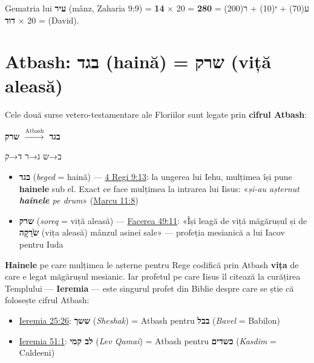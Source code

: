 \documentclass[12pt,a4paper,twoside,openany]{book}
\begin{document}
Gematria lui \textbf{עיר} (mânz, Zaharia 9:9) = ע(70) + י(10) + ר(200) = \textbf{280} = 20 × \textbf{14} = 20 × \textbf{דוד} (David).

\section{Atbash: בגד (haină) = שרק (viță aleasă)}

Cele două surse vetero-testamentare ale Floriilor sunt legate prin \textbf{cifrul Atbash}:

\begin{center}
\large\bfseries
בגד $\xrightarrow{\text{Atbash}}$ שרק
\end{center}

\begin{center}
ב→ש \quad ג→ר \quad ד→ק
\end{center}

\begin{itemize}
  \item \textbf{בגד} (\textit{beged} = haină) — \href{https://bibliaortodoxa.ro/carte.php?id=69\&cap=9\#13}{4 Regi 9:13}: la ungerea lui Iehu, mulțimea își pune \textbf{hainele} sub el. Exact ce face mulțimea la intrarea lui Iisus: «\textit{și-au așternut \textbf{hainele} pe drum}» (\href{https://bibliaortodoxa.ro/carte.php?id=53\&cap=11\#8}{Marcu 11:8})
  \item \textbf{שרק} (\textit{soreq} = viță aleasă) — \href{https://bibliaortodoxa.ro/carte.php?id=25\&cap=49\#11}{Facerea 49:11}: «Își leagă de viță măgărușul și de \textbf{שֹׂרֵקָה} (vița aleasă) mânzul asinei sale» — profeția mesianică a lui Iacov pentru Iuda
\end{itemize}

\textbf{Hainele} pe care mulțimea le așterne pentru Rege codifică prin Atbash \textbf{vița} de care e legat măgărușul mesianic. Iar profetul pe care Iisus îl citează la curățirea Templului — \textbf{Ieremia} — este singurul profet din Biblie despre care se știe că folosește cifrul Atbash:
\begin{itemize}
  \item \href{https://bibliaortodoxa.ro/carte.php?id=31\&cap=25\#26}{Ieremia 25:26}: \textbf{ששך} (\textit{Sheshak}) = Atbash pentru \textbf{בבל} (\textit{Bavel} = Babilon)
  \item \href{https://bibliaortodoxa.ro/carte.php?id=31\&cap=51\#1}{Ieremia 51:1}: \textbf{לב קמי} (\textit{Lev Qamai}) = Atbash pentru \textbf{כשדים} (\textit{Kasdim} = Caldeeni)
\end{itemize}
\end{document}
